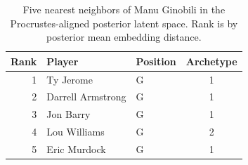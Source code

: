 \begin{table}[htbp]
  \centering\small
  \begin{tabular}{rllc}
    \toprule
    Rank & Player & Position & Archetype \\
    \midrule
    1 & Ty Jerome & G & 1 \\
    2 & Darrell Armstrong & G & 1 \\
    3 & Jon Barry & G & 1 \\
    4 & Lou Williams & G & 2 \\
    5 & Eric Murdock & G & 1 \\
    \bottomrule
  \end{tabular}
  \caption{Five nearest neighbors of Manu Ginobili in the Procrustes-aligned posterior latent space. Rank is by posterior mean embedding distance.}
  \label{tab:Manu_Ginobili_neighbors}
\end{table}

